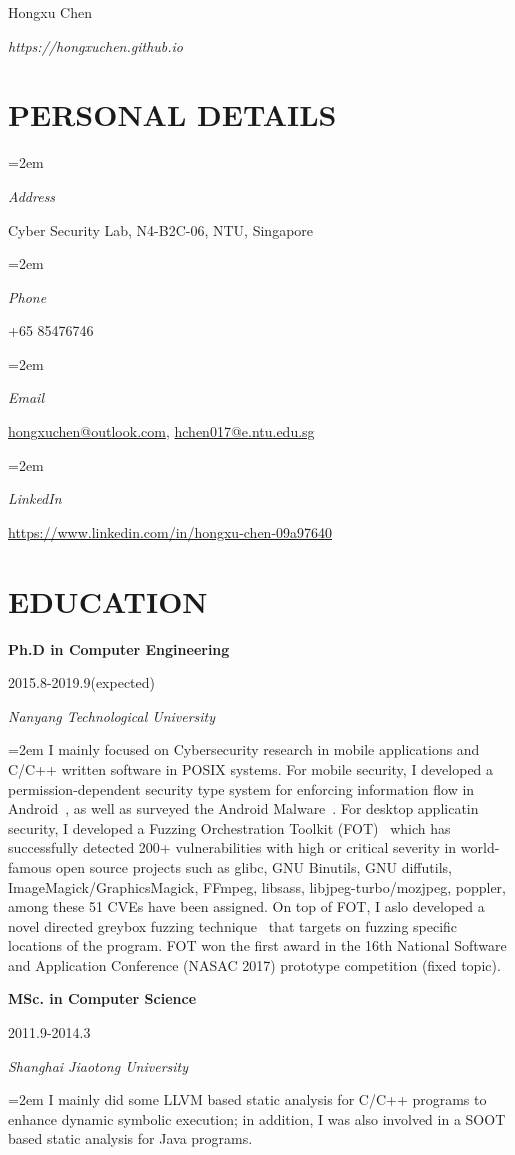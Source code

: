 \documentclass[paper=a4,fontsize=11pt]{article} %
\newlength{\spacebox}
\newcommand{\sepspace}{\vspace*{9pt}}		%
\newcommand{\MyName}[1]{ %
		\Huge \usefont{OT1}{phv}{b}{n} \hfill #1
		\par \normalsize \normalfont}
\newcommand{\MySlogan}[1]{ %
		\large \usefont{OT1}{phv}{m}{n}\hfill \textit{#1}
		\par \normalsize \normalfont}
\newcommand{\NewPart}[1]{\section*{\uppercase{#1}}}
\newcommand{\PersonalEntry}[2]{
		\noindent\hangindent=2em\hangafter=0 %
		\parbox{\spacebox}{        %
		\textit{#1}}		       %
		\hspace{1.5em} #2 \par}    %
\newcommand{\EducationEntry}[4]{
		\noindent \textbf{#1} \hfill      %
			\parbox{12em}{%
			\hfill\color{Black}#2} \par  %
		\noindent \textit{#3} \par        %
		\noindent\hangindent=2em\hangafter=0 \small #4 %
		\normalsize \par}
\begin{document}
\nocite{*}


\MyName{Hongxu Chen}
\MySlogan{{https://hongxuchen.github.io}}


\sepspace

\NewPart{Personal details}{}

\PersonalEntry{Address}{Cyber Security Lab, N4-B2C-06, NTU, Singapore}
\PersonalEntry{Phone}{+65 85476746}
\PersonalEntry{Email}{\url{hongxuchen@outlook.com}, \url{hchen017@e.ntu.edu.sg}}
\PersonalEntry{LinkedIn}{\url{https://www.linkedin.com/in/hongxu-chen-09a97640}}

\NewPart{Education}{}

\EducationEntry{Ph.D in Computer Engineering}{2015.8-2019.9(expected)}{Nanyang Technological University}{
    I mainly focused on Cybersecurity research in mobile applications and C/C++ written software in POSIX systems. For mobile security, I developed a permission-dependent security type system for enforcing information flow in Android~\cite{sta}, as well as surveyed the Android Malware~\cite{XueM0TC0Z17}. For desktop applicatin security, I developed a Fuzzing Orchestration Toolkit (FOT)~\cite{fse18-fot} which has successfully detected 200+ vulnerabilities with high or critical severity in world-famous open source projects such as glibc, GNU Binutils, GNU diffutils, ImageMagick/GraphicsMagick, FFmpeg, libsass, libjpeg-turbo/mozjpeg, poppler, among these 51 CVEs have been assigned. On top of FOT, I aslo developed a novel directed greybox fuzzing technique~\cite{hawkeye} that targets on fuzzing specific locations of the program. FOT won the first award in the 16th National Software and Application Conference (NASAC 2017) prototype competition (fixed topic).
}
\sepspace

\EducationEntry{MSc. in Computer Science}{2011.9-2014.3}{Shanghai Jiaotong University}{
  I mainly did some LLVM based static analysis for C/C++ programs to enhance dynamic symbolic execution; in addition, I was also involved in a SOOT based static analysis for Java programs.}
\sepspace
\end{document}
